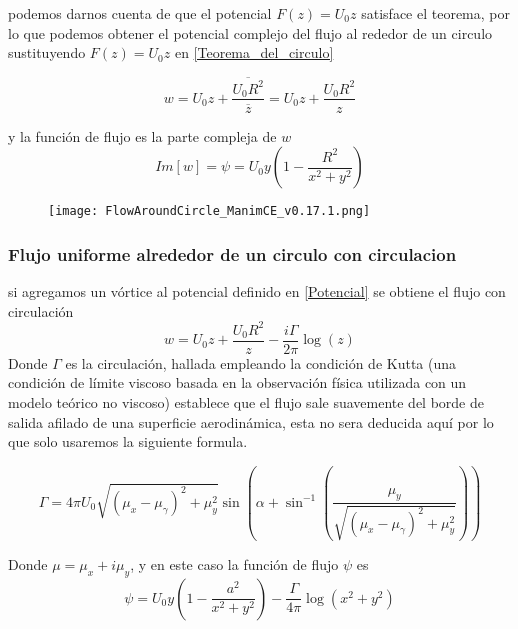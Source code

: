 \documentclass[12pt]{article}
\begin{document}
		podemos darnos cuenta de que el potencial $F(z)= U_0 z$ satisface el teorema, por lo que podemos obtener el potencial complejo  del flujo al rededor de un circulo sustituyendo $F(z)= U_0 z$ en \ref*{Teorema_del_circulo} 

		\begin{equation}
			w = U_0 z + \frac{\overline{U_0 R^2} }{\overline{z} } = U_0 z +\frac{U_0 R^2}{z} 
		\end{equation}

		y la función de flujo es la parte compleja de $w$
		\begin{equation}
			Im[w]=\psi =  U_0 y \left( 1- \frac{R^2}{x^2 + y^2}\right)
			\label{Potencial}
		\end{equation}
		

		\begin{figure}[!h]
			\begin{small}
				\begin{center}
					\texttt{[image: FlowAroundCircle\_ManimCE\_v0.17.1.png]}
				\end{center}
				\caption{}
				\label{fig:}
			\end{small}
		\end{figure}
		
		\subsubsection{Flujo uniforme alrededor de un circulo con circulacion}
			si agregamos un vórtice al potencial definido en \ref{Potencial} se obtiene el flujo con circulación
			\begin{equation}
				w = U_0z + \frac{ U_0R^2}{z} - \frac{i \Gamma}{2 \pi}\log (z)
			\end{equation}
			Donde  $\Gamma$ es la circulación, hallada empleando la condición de Kutta (una condición de límite viscoso basada en la observación física utilizada con un modelo teórico no viscoso) establece que el flujo sale suavemente del borde de salida afilado de una superficie aerodinámica, esta no sera deducida aquí por lo que solo usaremos la siguiente formula.

			\begin{equation}
				\Gamma=4 \pi U_0 \sqrt{\left(\mu_x-\mu_\gamma\right)^2+\mu_y^2} \sin \left(\alpha+\sin ^{-1}\left(\frac{\mu_y}{\sqrt{\left(\mu_x-\mu_\gamma\right)^2+\mu_y^2}}\right)\right) 
				\label{eq:}
			\end{equation}

			Donde $\mu=\mu_x+i \mu_y$, y en este caso la función de flujo $ \psi $ es 
			\begin{equation}
				\psi = U_0 y \left( 1 - \frac{a^2}{x^2+y^2} \right) - \frac{\Gamma}{4\pi} \log\left(x^2+y^2\right)
			\end{equation}
\end{document}

